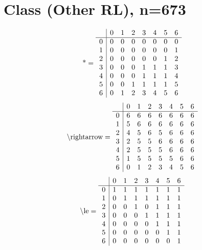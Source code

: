 \documentclass[11pt]{article}
\begin{document}
\section{Class (Other RL), n=673}
\[\text{*} = 
\begin{array}{r | r r r r r r r}
 & 0 & 1 & 2 & 3 & 4 & 5 & 6 \\ \hline
0 & 0 & 0 & 0 & 0 & 0 & 0 & 0 \\
1 & 0 & 0 & 0 & 0 & 0 & 0 & 1 \\
2 & 0 & 0 & 0 & 0 & 0 & 1 & 2 \\
3 & 0 & 0 & 0 & 1 & 1 & 1 & 3 \\
4 & 0 & 0 & 0 & 1 & 1 & 1 & 4 \\
5 & 0 & 0 & 1 & 1 & 1 & 1 & 5 \\
6 & 0 & 1 & 2 & 3 & 4 & 5 & 6 \\
\end{array}
\]
\[\text{\textbackslash rightarrow} = 
\begin{array}{r | r r r r r r r}
 & 0 & 1 & 2 & 3 & 4 & 5 & 6 \\ \hline
0 & 6 & 6 & 6 & 6 & 6 & 6 & 6 \\
1 & 5 & 6 & 6 & 6 & 6 & 6 & 6 \\
2 & 4 & 5 & 6 & 5 & 6 & 6 & 6 \\
3 & 2 & 5 & 5 & 6 & 6 & 6 & 6 \\
4 & 2 & 5 & 5 & 5 & 6 & 6 & 6 \\
5 & 1 & 5 & 5 & 5 & 5 & 6 & 6 \\
6 & 0 & 1 & 2 & 3 & 4 & 5 & 6 \\
\end{array}
\]
\[\text{\textbackslash le} = 
\begin{array}{r | r r r r r r r}
 & 0 & 1 & 2 & 3 & 4 & 5 & 6 \\ \hline
0 & 1 & 1 & 1 & 1 & 1 & 1 & 1 \\
1 & 0 & 1 & 1 & 1 & 1 & 1 & 1 \\
2 & 0 & 0 & 1 & 0 & 1 & 1 & 1 \\
3 & 0 & 0 & 0 & 1 & 1 & 1 & 1 \\
4 & 0 & 0 & 0 & 0 & 1 & 1 & 1 \\
5 & 0 & 0 & 0 & 0 & 0 & 1 & 1 \\
6 & 0 & 0 & 0 & 0 & 0 & 0 & 1 \\
\end{array}
\]
\end{document}
